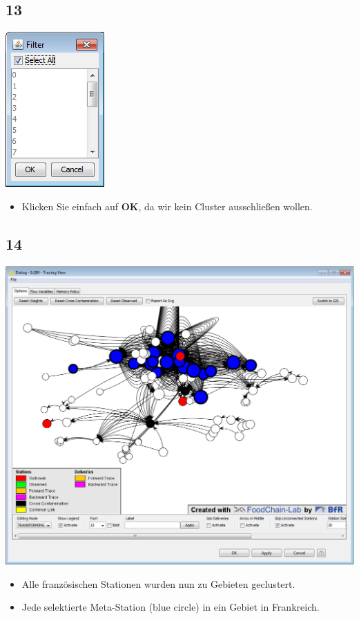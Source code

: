 \documentclass{beamer}
\begin{document}
\subsection{13}
\begin{frame}
	\begin{center}
  		\includegraphics[height=0.5\textheight]{13.png}
	\end{center}
	\begin{itemize}
		\item Klicken Sie einfach auf \textbf{OK}, da wir kein Cluster ausschließen wollen.
	\end{itemize}
\end{frame}

\subsection{14}
\begin{frame}
	\begin{center}
  		\includegraphics[height=0.6\textheight]{14.png}
	\end{center}
	\begin{itemize}
		\item Alle französischen Stationen wurden nun zu Gebieten geclustert.
		\item Jede selektierte Meta-Station (blue circle) in ein Gebiet in Frankreich.		
	\end{itemize}
\end{frame}
\end{document}
